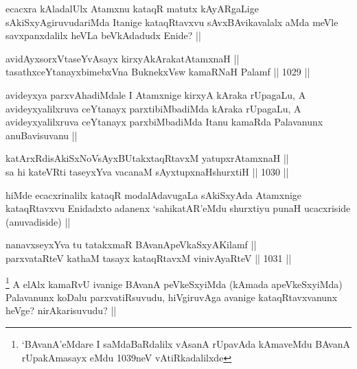 \begin{artha}
ecacxra kAladalUlx Atamxnu kataqR matutx kAyARgaLige sAkiSxyAgiruvudariMda Itanige kataqRtavxvu sAvxBAvikavalalx aMda meVle savxpanxdalilx heVLa beVkAdadudx Enide? ||
\end{artha}

\begin{shl}
avidAyxsorxVtaseYvAsayx kirxyAkArakatA\s \s tamxnaH || \\
tasathxceYtanayxbimebxVna BuknekxV\s sw kamaRNaH Palamf ||  1029 ||  
\end{shl}

\begin{artha}
avideyxya parxvAhadiMdale I Atamxnige kirxyA kAraka rUpagaLu, A avideyxyalilxruva ceYtanayx parxtibiMbadiMda kAraka rUpagaLu, A avideyxyalilxruva ceYtanayx parxbiMbadiMda Itanu kamaRda Palavanunx anuBavisuvanu ||
\end{artha}


\begin{shl}
katArxRdisAkiSxNoV\s sAyxBUtakxtaqRtavxM yatupxrA\s \s tamxnaH || \\
sa hi kateVRti taseyxYva vacanaM sAyxtupxnaHshurxtiH ||  1030 ||  
\end{shl}

\begin{artha}
hiMde ecacxrinalilx kataqR modalAdavugaLa sAkiSxyAda Atamxnige kataqRtavxvu Enidadxto adanenx `sahikatAR'eMdu shurxtiyu punaH ucacxriside (anuvadiside) ||
\end{artha}


\begin{shl}
nanavxseyxYva tu tatakxmaR BAvanApeVkaSxyA\s Kilamf || \\
parxvataRteV kathaM tasayx kataqRtavxM vinivAyaRteV ||  1031 ||  
\end{shl}

\begin{artha}
\footnote{`BAvanA'eMdare I saMdaBaRdalilx vAsanA rUpavAda kAmaveMdu BAvanA rUpakAmasayx eMdu 1039neV vAtiRkadalilxde}
A elAlx kamaRvU ivanige BAvanA peVkeSxyiMda (kAmada apeVkeSxyiMda) Palavanunx koDalu parxvatiRsuvudu, hiVgiruvAga avanige kataqRtavxvanunx heVge? nirAkarisuvudu? ||
\end{artha}


